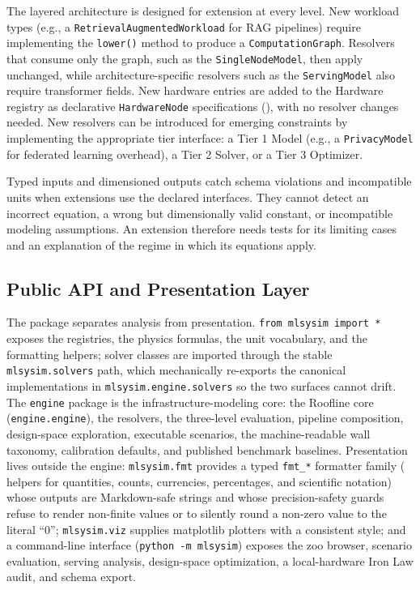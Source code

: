 \documentclass[10pt,twocolumn]{article}
\begin{document}
The layered architecture is designed for extension at every level. New workload types (e.g., a \texttt{RetrievalAugmentedWorkload} for RAG pipelines) require implementing the \texttt{lower()} method to produce a \texttt{ComputationGraph}. Resolvers that consume only the graph, such as the \texttt{SingleNodeModel}, then apply unchanged, while architecture-specific resolvers such as the \texttt{ServingModel} also require transformer fields. New hardware entries are added to the Hardware registry as declarative \texttt{HardwareNode} specifications (), with no resolver changes needed. New resolvers can be introduced for emerging constraints by implementing the appropriate tier interface: a Tier 1 Model (e.g., a \texttt{PrivacyModel} for federated learning overhead), a Tier 2 Solver, or a Tier 3 Optimizer.

Typed inputs and dimensioned outputs catch schema violations and incompatible units when extensions use the declared interfaces. They cannot detect an incorrect equation, a wrong but dimensionally valid constant, or incompatible modeling assumptions. An extension therefore needs tests for its limiting cases and an explanation of the regime in which its equations apply.

\subsection{Public API and Presentation Layer}
\label{sec:api}

The package separates analysis from presentation. \texttt{from mlsysim import *} exposes the registries, the physics formulas, the unit vocabulary, and the formatting helpers; solver classes are imported through the stable \texttt{mlsysim.solvers} path, which mechanically re-exports the canonical implementations in \texttt{mlsysim.engine.solvers} so the two surfaces cannot drift. The \texttt{engine} package is the infrastructure-modeling core: the Roofline core (\texttt{engine.engine}), the \CountResolvers{} resolvers, the three-level evaluation, pipeline composition, design-space exploration, executable scenarios, the machine-readable wall taxonomy, calibration defaults, and published benchmark baselines. Presentation lives outside the engine: \texttt{mlsysim.fmt} provides a typed \texttt{fmt\_*} formatter family (\CountFormatters{} helpers for quantities, counts, currencies, percentages, and scientific notation) whose outputs are Markdown-safe strings and whose precision-safety guards refuse to render non-finite values or to silently round a non-zero value to the literal ``0''; \texttt{mlsysim.viz} supplies matplotlib plotters with a consistent style; and a command-line interface (\texttt{python -m mlsysim}) exposes the zoo browser, scenario evaluation, serving analysis, design-space optimization, a local-hardware Iron Law audit, and schema export.
\end{document}
